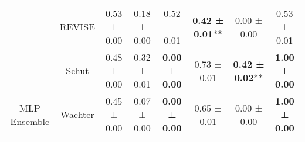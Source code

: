\begin{table}
{\begin{tabular}[t]{cccccccc}
 & REVISE & 0.53 ± 0.00\hphantom{*}\hphantom{*} & 0.18 ± 0.00\hphantom{*}\hphantom{*} & 0.52 ± 0.01\hphantom{*}\hphantom{*} & \textbf{0.42 ± 0.01}** & 0.00 ± 0.00\hphantom{*}\hphantom{*} & 0.53 ± 0.01\hphantom{*}\hphantom{*}\\

 & Schut & 0.48 ± 0.00\hphantom{*}\hphantom{*} & 0.32 ± 0.01\hphantom{*}\hphantom{*} & \textbf{0.00 ± 0.00}\hphantom{*}\hphantom{*} & 0.73 ± 0.01\hphantom{*}\hphantom{*} & \textbf{0.42 ± 0.02}** & \textbf{1.00 ± 0.00}\hphantom{*}\hphantom{*}\\

\multirow[t]{-9}{*}{\centering\arraybackslash MLP Ensemble} & Wachter & 0.45 ± 0.00\hphantom{*}\hphantom{*} & 0.07 ± 0.00\hphantom{*}\hphantom{*} & \textbf{0.00 ± 0.00}\hphantom{*}\hphantom{*} & 0.65 ± 0.01\hphantom{*}\hphantom{*} & 0.00 ± 0.00\hphantom{*}\hphantom{*} & \textbf{1.00 ± 0.00}\hphantom{*}\hphantom{*}\\
\bottomrule
\end{tabular}}
\end{table}
